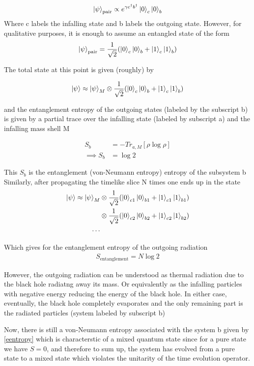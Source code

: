 \begin{align}
 \Ket{\psi}_\text{pair} \propto e^{\gamma c^\dag b^\dag} \Ket{0}_c \Ket{0}_b
\end{align}
Where c labels the infalling state and b labels the outgoing state. However, for qualitative purposes, it is enough to assume an entangled state of the form 
\begin{align}
 \Ket{\psi}_\text{pair} = \frac{1}{\sqrt{2}}(\Ket{0}_c \Ket{0}_b+\Ket{1}_c \Ket{1}_b)
\end{align}

The total state at this point is given (roughly) by

\begin{align}
 \Ket{\psi} \approx \Ket{\psi}_M \otimes \frac{1}{\sqrt{2}}(\Ket{0}_c \Ket{0}_b+\Ket{1}_c \Ket{1}_b)
\end{align}

and the entanglement entropy of the outgoing states (labeled by the subscript b) is given by a partial trace over the infalling state (labeled by subscript a) and the infalling mass shell M

\begin{align}
 S_b &= -Tr_{a,M}[\rho \log \rho] \\
 \implies S_b &= \log 2 
\end{align}

This $S_b$ is the entanglement (von-Neumann entropy) entropy of the subsystem b
Similarly, after propagating the timelike slice N times one ends up in the state 
\begin{align*}
 \Ket{\psi} \approx \Ket{\psi}_M &\otimes \frac{1}{\sqrt{2}}(\Ket{0}_{c1} \Ket{0}_{b1}+\Ket{1}_{c1} \Ket{1}_{b1}) \\
&\otimes \frac{1}{\sqrt{2}}(\Ket{0}_{c2} \Ket{0}_{b2}+\Ket{1}_{c2} \Ket{1}_{b2}) \\
\cdots
\end{align*}

Which gives for the entanglement entropy of the outgoing radiation
\begin{align}
 S_\text{entanglement} = N\log 2 \label{eentropy}
\end{align}

However, the outgoing radiation can be understood as thermal radiation due to the black hole radiatng away its mass. Or equivalently as the infalling particles with negative energy reducing the energy of the black hole. In either case, eventually, the black hole completely evaporates and the only remaining part is the radiated particles (system labeled by subscript b)


 
 
 Now, there is still a von-Neumann entropy associated with the system b given by \ref{eentropy} which is characterstic of a mixed quantum state since for a pure state we have $S=0$, and therefore to sum up, the system has evolved from a pure state to a mixed state which violates the unitarity of the time evolution operator. 
